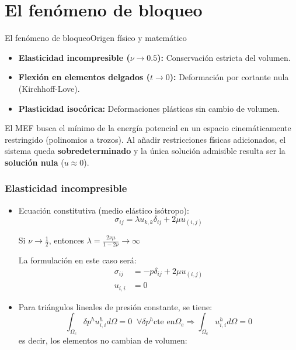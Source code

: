 \documentclass[10pt, aspectratio=43]{beamer}
\begin{document}
\section[Bloqueo]{El fenómeno de bloqueo}
\begin{frame}{El fenómeno de bloqueo}{Origen físico y matemático}
  \begin{uicard}[title=Restricciones físicas habituales]
    \begin{itemize}
      \item \textbf{Elasticidad incompresible ($\nu \to 0.5$):} Conservación estricta del volumen.
      \item \textbf{Flexión en elementos delgados ($t \to 0$):} Deformación por cortante nula (Kirchhoff-Love).
      \item \textbf{Plasticidad isocórica:} Deformaciones plásticas sin cambio de volumen.
    \end{itemize}
  \end{uicard}

  \vspace{0.1cm}

  \begin{uicard}[title=¿Por qué se produce el bloqueo?]
    El MEF busca el mínimo de la energía potencial en un espacio cinemáticamente restringido (polinomios a trozos). Al añadir restricciones físicas adicionados, el sistema queda \textbf{sobredeterminado} y la única solución admisible resulta ser la \textbf{solución nula} ($u \approx 0$).
  \end{uicard}
\end{frame}
\begin{frame}
\frametitle{Elasticidad incompresible}
\begin{itemize}
\item Ecuación constitutiva (medio elástico isótropo):
$$
\sigma_{ij}=\lambda u_{k,k} \delta_{ij}+2 \mu u_{(i,j)}
$$

Si $\nu \rightarrow \frac{1}{2}$, entonces $\lambda=\frac{2 \nu \mu}{1-2\nu}
\rightarrow \infty$

La formulación en este caso será:
\begin{align*}
\sigma_{ij}&=-p \delta_{ij}+2 \mu u_{(i,j)} \\
u_{i,i}&=0
\end{align*}
\item Para triángulos lineales de presión constante, se tiene:
$$\int_{\Omega_e} \delta p^h u^h_{i,i} d\Omega=0 \;\; \forall \delta p^h \mbox{cte en
} \Omega_e
\Rightarrow \int_{\Omega_e} u^h_{i,i} d\Omega=0$$
es decir, los elementos no cambian de volumen:
\end{itemize}
\end{frame}
\end{document}

